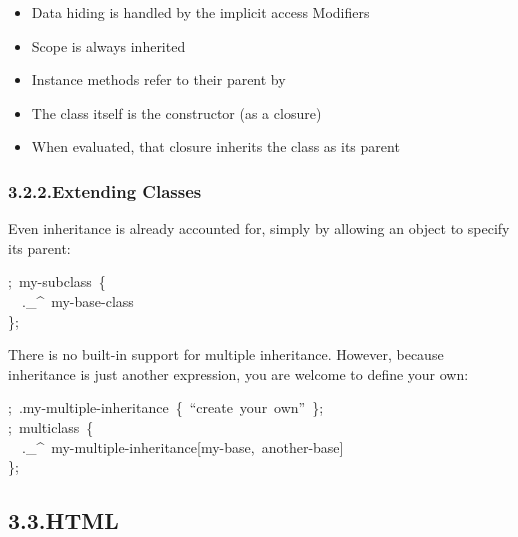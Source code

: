 \documentclass[preprint]{{sigplanconf}}
\begin{document}
\begin{itemize}[noitemsep,topsep=\mdcompacttopsep]%

\item{}Data hiding is handled by the implicit access Modifiers%

\item{}Scope is always inherited%

\item{}Instance methods refer to their parent by \mdcode{\_\textasciicircum{}}%

\item{}The class itself is the constructor (as a closure)%

\item{}When evaluated, that closure inherits the class as its parent%
\end{itemize}%

\subsubsection{3.2.2.\hspace*{0.5em}Extending Classes}\label{sec-extending-classes}%

\noindent{}Even inheritance is already accounted for, simply by allowing an object to specify its parent:%
\begin{mdpre}%
\noindent;~my-subclass~\{\\
~~.\_\textasciicircum{}~my-base-{class}\\
\};%
\end{mdpre}\noindent{}There is no built-in support for multiple inheritance.  However, because
inheritance is just another expression, you are welcome to define your own:
\begin{mdpre}%
\noindent;~.my-multiple-inheritance~\{~“create~your~own”~\};\\
;~multiclass~\{\\
~~.\_\textasciicircum{}~my-multiple-inheritance{}[my-base,~another-base]\\
\};%
\end{mdpre}
\subsection{3.3.\hspace*{0.5em}HTML}\label{sec-html}%
\end{document}
